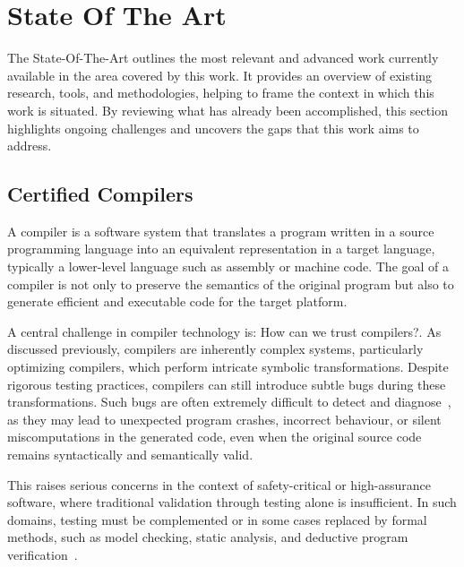 
%

\chapter{State Of The Art}
\label{cha:State_Of_The_Art}

The State-Of-The-Art outlines the most relevant and advanced work currently available in the area covered by this work. 
It provides an overview of existing research, tools, and methodologies, helping to frame the context in which this work is situated. 
By reviewing what has already been accomplished, this section highlights ongoing challenges and uncovers the gaps that this work 
aims to address.

\section{Certified Compilers}
\label{sec:Certified_Compilers}

A compiler is a software system that translates a program written in a source programming language into an equivalent representation 
in a target language, typically a lower-level language such as assembly or machine code. The goal of a compiler is not only to preserve 
the semantics of the original program but also to generate efficient and executable code for the target platform.~\cite{AhoSU86}

A central challenge in compiler technology is: How can we trust compilers?. As discussed previously, compilers are 
inherently complex systems, particularly optimizing compilers, which perform intricate symbolic transformations. 
Despite rigorous testing practices, compilers can still introduce subtle bugs during these transformations. Such bugs are often 
extremely difficult to detect and diagnose~\cite{Leroy09-back-end}, as they may lead to unexpected program crashes, 
incorrect behaviour, or silent miscomputations in the generated code, even when the original source code remains syntactically and 
semantically valid.

This raises serious concerns in the context of safety-critical or high-assurance software, where traditional validation 
through testing alone is insufficient. In such domains, testing must be complemented or in some cases replaced by formal methods, 
such as model checking, static analysis, and deductive program verification~\cite{Leroy09-back-end}.


